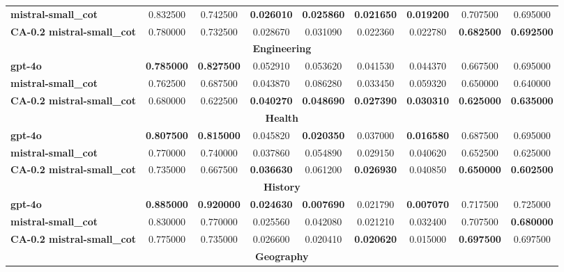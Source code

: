 {\begin{longtable}{|l|cc|cc|cc|cc|}
\multicolumn{1}{|l|}{\textbf{mistral-small\_cot}} & 0.832500 & 0.742500 & \textbf{0.026010} & \textbf{0.025860} & \textbf{0.021650} & \textbf{0.019200} & 0.707500 & 0.695000 \\
\multicolumn{1}{|l|}{\textbf{CA-0.2 mistral-small\_cot}} & 0.780000 & 0.732500 & 0.028670 & 0.031090 & 0.022360 & 0.022780 & \textbf{0.682500} & \textbf{0.692500} \\
\hline
\multicolumn{9}{|c|}{\textbf{Engineering}} \\
\hline
\multicolumn{1}{|l|}{\textbf{gpt-4o}} & \textbf{0.785000} & \textbf{0.827500} & 0.052910 & 0.053620 & 0.041530 & 0.044370 & 0.667500 & 0.695000 \\
\multicolumn{1}{|l|}{\textbf{mistral-small\_cot}} & 0.762500 & 0.687500 & 0.043870 & 0.086280 & 0.033450 & 0.059320 & 0.650000 & 0.640000 \\
\multicolumn{1}{|l|}{\textbf{CA-0.2 mistral-small\_cot}} & 0.680000 & 0.622500 & \textbf{0.040270} & \textbf{0.048690} & \textbf{0.027390} & \textbf{0.030310} & \textbf{0.625000} & \textbf{0.635000} \\
\hline
\multicolumn{9}{|c|}{\textbf{Health}} \\
\hline
\multicolumn{1}{|l|}{\textbf{gpt-4o}} & \textbf{0.807500} & \textbf{0.815000} & 0.045820 & \textbf{0.020350} & 0.037000 & \textbf{0.016580} & 0.687500 & 0.695000 \\
\multicolumn{1}{|l|}{\textbf{mistral-small\_cot}} & 0.770000 & 0.740000 & 0.037860 & 0.054890 & 0.029150 & 0.040620 & 0.652500 & 0.625000 \\
\multicolumn{1}{|l|}{\textbf{CA-0.2 mistral-small\_cot}} & 0.735000 & 0.667500 & \textbf{0.036630} & 0.061200 & \textbf{0.026930} & 0.040850 & \textbf{0.650000} & \textbf{0.602500} \\
\hline
\multicolumn{9}{|c|}{\textbf{History}} \\
\hline
\multicolumn{1}{|l|}{\textbf{gpt-4o}} & \textbf{0.885000} & \textbf{0.920000} & \textbf{0.024630} & \textbf{0.007690} & 0.021790 & \textbf{0.007070} & 0.717500 & 0.725000 \\
\multicolumn{1}{|l|}{\textbf{mistral-small\_cot}} & 0.830000 & 0.770000 & 0.025560 & 0.042080 & 0.021210 & 0.032400 & 0.707500 & \textbf{0.680000} \\
\multicolumn{1}{|l|}{\textbf{CA-0.2 mistral-small\_cot}} & 0.775000 & 0.735000 & 0.026600 & 0.020410 & \textbf{0.020620} & 0.015000 & \textbf{0.697500} & 0.697500 \\
\hline
\multicolumn{9}{|c|}{\textbf{Geography}} \\

\end{longtable}}
